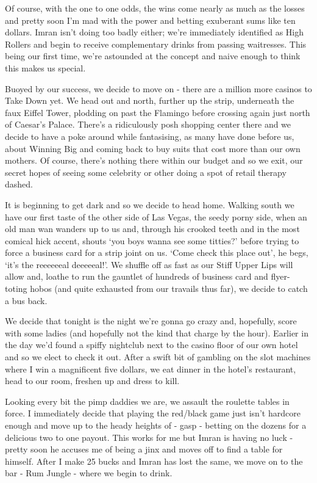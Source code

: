 \documentclass[a5paper,titlepage,11pt]{book}
\begin{document}
Of course, with the one to one odds, the wins come nearly as much as the losses and pretty soon I'm mad with the power and betting exuberant sums like ten dollars.  Imran isn't doing too badly either; we're immediately identified as High Rollers and begin to receive complementary drinks from passing waitresses.  This being our first time, we're astounded at the concept and naive enough to think this makes us special.

Buoyed by our success, we decide to move on - there are a million more casinos to Take Down yet.  We head out and north, further up the strip, underneath the faux Eiffel Tower, plodding on past the Flamingo before crossing again just north of Caesar's Palace.  There's a ridiculously posh shopping center there and we decide to have a poke around while fantasising, as many have done before us, about Winning Big and coming back to buy suits that cost more than our own mothers.  Of course, there's nothing there within our budget and so we exit, our secret hopes of seeing some celebrity or other doing a spot of retail therapy dashed.

It is beginning to get dark and so we decide to head home.  Walking south we have our first taste of the other side of Las Vegas, the seedy porny side, when an old man wan wanders up to us and, through his crooked teeth and in the most comical hick accent, shouts `you boys wanna see some titties?' before trying to force a business card for a strip joint on us. `Come check this place out', he begs, `it's the reeeeeeal deeeeeal!'.  We shuffle off as fast as our Stiff Upper Lips will allow and, loathe to run the gauntlet of hundreds of business card and flyer-toting hobos (and quite exhausted from our travails thus far), we decide to catch a bus back.

We decide that tonight is the night we're gonna go crazy and, hopefully, score with some ladies (and hopefully not the kind that charge by the hour).  Earlier in the day we'd found a spiffy nightclub next to the casino floor of our own hotel and so we elect to check it out.  After a swift bit of gambling on the slot machines where I win a magnificent five dollars, we eat dinner in the hotel's restaurant, head to our room, freshen up and dress to kill.

Looking every bit the pimp daddies we are, we assault the roulette tables in force.  I immediately decide that playing the red/black game just isn't hardcore enough and move up to the heady heights of - gasp - betting on the dozens for a delicious two to one payout.  This works for me but Imran is having no luck - pretty soon he accuses me of being a jinx and moves off to find a table for himself.  After I make 25 bucks and Imran has lost the same, we move on to the bar - Rum Jungle - where we begin to drink.
\end{document}
